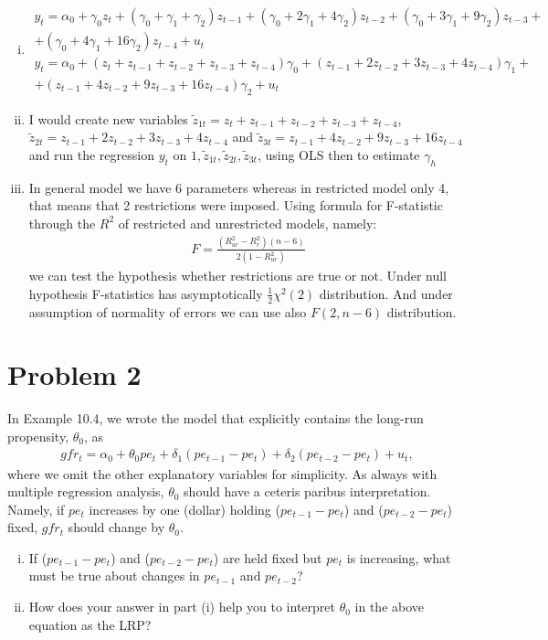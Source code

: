 \documentclass[a4paper]{article}
\begin{document}
\begin{enumerate}[(i)]
	\item 
	\begin{align*}
	y_t = \alpha_0 + \gamma_0 z_t + (\gamma_0 + \gamma_1 + \gamma_2)z_{t-1}+(\gamma_0 + 2\gamma_1 + 4\gamma_2) z_{t-2} + (\gamma_0 + 3\gamma_1 + 9\gamma_2)z_{t-3} + \\
	+(\gamma_0 + 4\gamma_1 + 16\gamma_2)z_{t-4} + u_t\\
	y_t = \alpha_0 + (z_t + z_{t-1} + z_{t-2} + z_{t-3}+z_{t-4})\gamma_0 + (z_{t-1} + 2z_{t-2}+3z_{t-3}+4z_{t-4})\gamma_1 +\\
	+(z_{t-1} + 4z_{t-2} + 9z_{t-3} + 16z_{t-4})\gamma_2 + u_t
	\end{align*}
	\item I would create new variables $\tilde{z}_{1t} = z_t + z_{t-1} + z_{t-2} + z_{t-3}+z_{t-4}$, $\tilde{z}_{2t} = z_{t-1} + 2z_{t-2}+3z_{t-3}+4z_{t-4}$ and $\tilde{z}_{3t} = z_{t-1} + 4z_{t-2} + 9z_{t-3} + 16z_{t-4}$ and run the regression $y_t$ on $1, \tilde{z}_{1t}, \tilde{z}_{2t}, \tilde{z}_{3t}$, using OLS then to estimate $\gamma_h$
	\item In general model we have 6 parameters whereas in restricted model only 4, that means that 2 restrictions were imposed. Using formula for F-statistic through the $R^2$ of restricted and unrestricted models, namely:
	\begin{align*}
	F = \frac{(R^2_{ur} - R^2_r)(n-6)}{2(1 - R^2_{ur})}
	\end{align*}
	we can test the hypothesis whether restrictions are true or not. Under null hypothesis F-statistics has asymptotically $\frac{1}{2} \chi^2(2)$ distribution. And under assumption of normality of errors we can use also $F(2, n-6)$ distribution.
\end{enumerate}
\section*{Problem 2}
 In Example 10.4, we wrote the model that explicitly contains the long-run propensity, $\theta_0$, as 
 \begin{align*} 
 gfr_t = \alpha_0 + \theta_0 pe_t + \delta_1 (pe_{t-1} - pe_t) + \delta_2 (pe_{t-2} - pe_t) + u_t,
 \end{align*}  
 where we omit the other explanatory variables for simplicity. As always with multiple regression analysis, $\theta_0$ should have a ceteris paribus interpretation. Namely, if $pe_t$  increases by one (dollar) holding ($pe_{t-1} - pe_t$) and ($pe_{t-2} - pe_t$) fixed, $gfr_t$ should change by $\theta_0$. 
 \begin{enumerate}[(i)]
\item  If ($pe_{t - 1} - pe_t$) and ($pe_{t-2} - pe_t$) are held fixed but $pe_t$ is increasing, what must be true about changes in $pe_{t-1}$ and $pe_{t-2}$?
\item How does your answer in part (i) help you to interpret $\theta_0$ in the above equation as the LRP? 
\end{enumerate}
\end{document}
